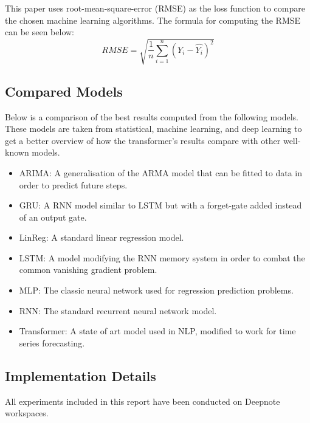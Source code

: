 This paper uses root-mean-square-error (RMSE) as the loss function to compare the chosen machine learning algorithms. The formula for computing the RMSE can be seen below: 
$$RMSE = \sqrt{\frac 1 n \displaystyle\sum_{i=1}^n(Y_i - \hat{Y_i})^2}$$

\subsection{Compared Models}
Below is a comparison of the best results computed from the following models. These models are taken from statistical, machine learning, and deep learning to get a better overview of how the transformer's results compare with other well-known models.
\begin{itemize}
    \item ARIMA: A generalisation of the ARMA model that can be fitted to data in order to predict future steps.
    \item GRU: A RNN model similar to LSTM but with a forget-gate added instead of an output gate.
    \item LinReg: A standard linear regression model.
    \item LSTM: A model modifying the RNN memory system in order to combat the common vanishing gradient problem.
    \item MLP: The classic neural network used for regression prediction problems.
    \item RNN: The standard recurrent neural network model.
    \item Transformer: A state of art model used in NLP, modified to work for time series forecasting.
\end{itemize}

\subsection{Implementation Details}
All experiments included in this report have been conducted on Deepnote workspaces.

